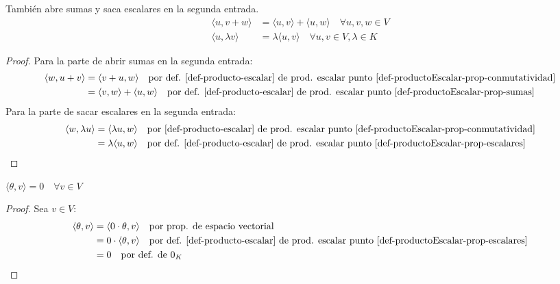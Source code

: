 \begin{obs}{}{}
    También abre sumas y saca escalares en la segunda entrada.
    \begin{align*}
        \langle u, v+w \rangle &= \langle u,v \rangle + \langle u,w \rangle \quad \forall u,v,w \in V\\
        \langle u, \lambda v \rangle &= \lambda \langle u,v \rangle \quad \forall u,v \in V, \lambda \in K
    \end{align*}
\end{obs}


\begin{proof}
    Para la parte de abrir sumas en la segunda entrada:
    \begin{align*}
        \langle w, u+v \rangle &= \langle v+u, w \rangle \quad \text{por def. \ref{def-producto-escalar} de prod. escalar punto \ref{def-productoEscalar-prop-conmutatividad}} \\
        &= \langle v,w \rangle + \langle u,w \rangle \quad \text{por def. \ref{def-producto-escalar} de prod. escalar punto \ref{def-productoEscalar-prop-sumas}} 
    \end{align*}
    Para la parte de sacar escalares en la segunda entrada:
    \begin{align*}
        \langle w, \lambda u \rangle &= \langle \lambda u, w \rangle \quad \text{por \ref{def-producto-escalar} de prod. escalar punto \ref{def-productoEscalar-prop-conmutatividad}} \\
        &= \lambda \langle u,w \rangle \quad \text{por def. \ref{def-producto-escalar} de prod. escalar punto \ref{def-productoEscalar-prop-escalares}} 
    \end{align*}
\end{proof}


\begin{obs}{}{}
    $\langle \theta, v \rangle = 0 \quad \forall v \in V$ 
\end{obs}
\begin{proof}
    Sea $v \in V$:
    \begin{align*}
        \langle \theta, v \rangle &= \langle 0 \cdot \theta, v \rangle \quad \text{por prop. de espacio vectorial} \\
        & = 0 \cdot \langle \theta, v \rangle \quad \text{por def. \ref{def-producto-escalar} de prod. escalar punto \ref{def-productoEscalar-prop-escalares}} \\
        &= 0 \quad \text{por def. de $0_K$}
    \end{align*}
\end{proof}

